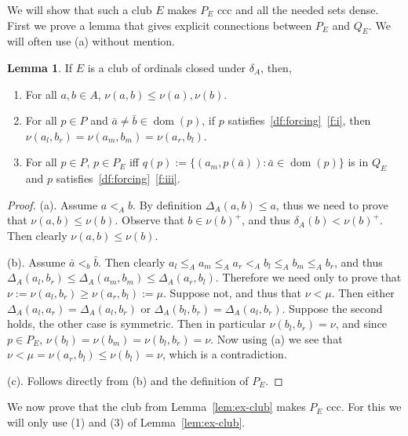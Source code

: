 \documentclass[10pt]{amsart}
\theoremstyle{definition}
\newtheorem{lemma}[theorem]{Lemma}
\theoremstyle{remark}
\newcommand{\ba}{\bar{a}}
\newcommand{\bb}{\bar{b}}
\newcommand{\1}{\mathbbm{1}}
\DeclareMathOperator{\dom}{dom}
\begin{document}
We will show that such a club $E$
makes $P_{E}$ ccc and all the needed sets dense. First we prove a
lemma that gives explicit connections between $P_{E}$
and $Q_{E}$. We will often use (a) without mention.

\begin{lemma}\label{lem:P-Q}
  If $E$ is a club of ordinals closed under $\delta_{A}$,
  then,
  \begin{enumerate}[label = (\alph*)]\itemsep0em
    \item For all $a,b \in A$, $\nu(a,b) \le \nu(a),\nu(b)$.
    \item For all $p \in P$ and $\ba \neq \bb \in \dom(p)$,
    if $p$ satisfies~\ref{df:forcing}~\ref{f:i}, then
    $\nu(a_{l},b_{r}) = \nu(a_{m},b_{m}) = \nu(a_{r},b_{l})$.
    \item For all $p \in P$, $p \in P_{E}$ iff
    $q(p) := \{(a_{m},p(\ba)) : \ba \in \dom(p)\}$ is in $Q_{E}$ and
    $p$ satisfies~\ref{df:forcing}~\ref{f:iii}.
  \end{enumerate}
\end{lemma}
\begin{proof}
  (a). Assume $a <_{A} b$. By definition $\Delta_{A}(a,b) \le a$, thus we need to prove
  that $\nu(a,b) \le \nu(b)$. Observe that $b \in {\nu(b)}^{+}$,
  and thus $\delta_{A}(b) < \nu(b)^{+}$. Then clearly $\nu(a,b) \le \nu(b)$.

  (b). Assume $\ba <_{b} \bb$. Then clearly $a_{l} \le_{A} a_{m} \le_{A} a_{r}
  <_{A} b_{l} \le_{A} b_{m} \le_{A} b_{r}$, and thus $\Delta_{A}(a_{l},b_{r}) \le \Delta_{A}(a_{m},b_{m}) \le \Delta_{A}(a_{r},b_{l})$. Therefore we need
  only to prove that $\nu := \nu(a_{l},b_{r}) \ge \nu(a_{r},b_{l}) := \mu$.
  Suppose not, and thus that $\nu < \mu$. Then either
  $\Delta_{A}(a_{l},a_{r}) = \Delta_{A}(a_{l},b_{r})$ or
  $\Delta_{A}(b_{l},b_{r}) = \Delta_{A}(a_{l},b_{r})$. Suppose the second holds,
  the other case is symmetric. Then in particular $\nu(b_{l},b_{r}) = \nu$,
  and since $p \in P_{E}$, $\nu(b_{l}) = \nu(b_{m}) = \nu(b_{l},b_{r}) = \nu$.
  Now using (a) we see that
  $\nu < \mu = \nu(a_{r},b_{l}) \le \nu(b_{l}) = \nu$, which is a contradiction.

  (c). Follows directly from (b) and the definition of $P_{E}$.
\end{proof}

We now prove that the club from Lemma~\ref{lem:ex-club} makes $P_{E}$ ccc.
For this we will only use (1) and (3) of Lemma~\ref{lem:ex-club}.
\end{document}

